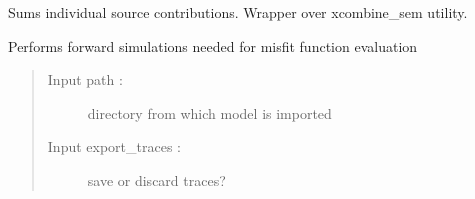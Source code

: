 \documentclass[letterpaper,10pt,english]{sphinxmanual}
\begin{document}
\begin{fulllineitems}

\begin{fulllineitems}
\label{\detokenize{ref/seisflows.solver:seisflows.solver.base.base.combine}}
Sums individual source contributions. Wrapper over xcombine\_sem
utility.

\end{fulllineitems}


\begin{fulllineitems}
\label{\detokenize{ref/seisflows.solver:seisflows.solver.base.base.cwd}}
\end{fulllineitems}


\begin{fulllineitems}
\label{\detokenize{ref/seisflows.solver:seisflows.solver.base.base.data_filenames}}
\end{fulllineitems}


\begin{fulllineitems}
\label{\detokenize{ref/seisflows.solver:seisflows.solver.base.base.eval_func}}
Performs forward simulations needed for misfit function evaluation
\begin{quote}\begin{description}
\item[{Input path :}] \leavevmode
directory from which model is imported

\item[{Input export\_traces :}] \leavevmode
save or discard traces?

\end{description}\end{quote}


\end{fulllineitems}
\end{fulllineitems}
\end{document}
